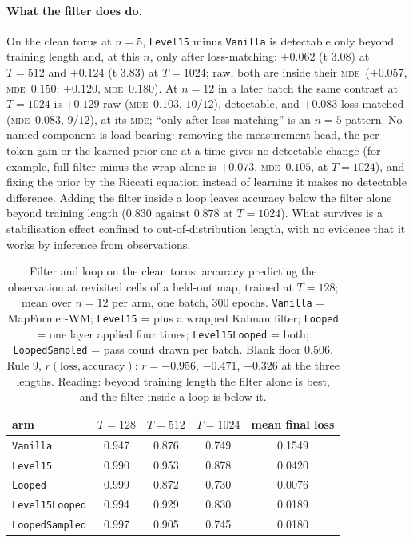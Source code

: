 \documentclass[10pt]{article}
\newcommand{\mde}{\textsc{mde}}
\newcommand{\arm}[1]{\texttt{#1}}
\begin{document}
\paragraph{What the filter does do.} On the clean torus at $n=5$, \arm{Level15} minus \arm{Vanilla} is
detectable only beyond training length and, at this $n$, only after loss-matching: $+0.062$ (t $3.08$) at $T=512$ and
$+0.124$ (t $3.83$) at $T=1024$; raw, both are inside their \mde\ ($+0.057$, \mde\ $0.150$; $+0.120$, \mde\
$0.180$). At $n=12$ in a later batch the same contrast at $T=1024$ is $+0.129$ raw (\mde\ $0.103$, $10/12$),
detectable, and $+0.083$ loss-matched (\mde\ $0.083$, $9/12$), at its \mde; ``only after loss-matching'' is an
$n=5$ pattern. No named component is load-bearing:
removing the measurement head, the per-token gain or the learned prior one at a time gives no detectable
change (for example, full filter minus the wrap alone is $+0.073$, \mde\ $0.105$, at $T=1024$), and fixing the
prior by the Riccati equation instead of learning it makes no detectable difference. Adding the filter inside a loop leaves accuracy
below the filter alone beyond training length ($0.830$ against $0.878$ at $T=1024$). What survives is a
stabilisation effect confined to out-of-distribution length, with no evidence that it works by inference from
observations.

\begin{table}[t]
\centering
\small
\captionsetup{font=footnotesize,skip=4pt}
\caption{Filter and loop on the clean torus: accuracy predicting the observation at revisited cells of a held-out map, trained at $T=128$; mean over $n=12$ per arm, one batch, 300 epochs. \arm{Vanilla} = MapFormer-WM; \arm{Level15} = plus a wrapped Kalman filter; \arm{Looped} = one layer applied four times; \arm{Level15Looped} = both; \arm{LoopedSampled} = pass count drawn per batch. Blank floor 0.506. Rule 9, $r(\text{loss},\text{accuracy})$: $r=-0.956$, $-0.471$, $-0.326$ at the three lengths. Reading: beyond training length the filter alone is best, and the filter inside a loop is below it.}
\label{tab:l15loop}
\begin{tabular}{@{}lcccc@{}}
\toprule
arm & $T=128$ & $T=512$ & $T=1024$ & mean final loss \\
\midrule
\arm{Vanilla}        & 0.947 & 0.876 & 0.749 & 0.1549 \\
\arm{Level15}        & 0.990 & 0.953 & 0.878 & 0.0420 \\
\arm{Looped}         & 0.999 & 0.872 & 0.730 & 0.0076 \\
\arm{Level15Looped}  & 0.994 & 0.929 & 0.830 & 0.0189 \\
\arm{LoopedSampled}  & 0.997 & 0.905 & 0.745 & 0.0180 \\
\bottomrule
\end{tabular}
\end{table}
\end{document}
